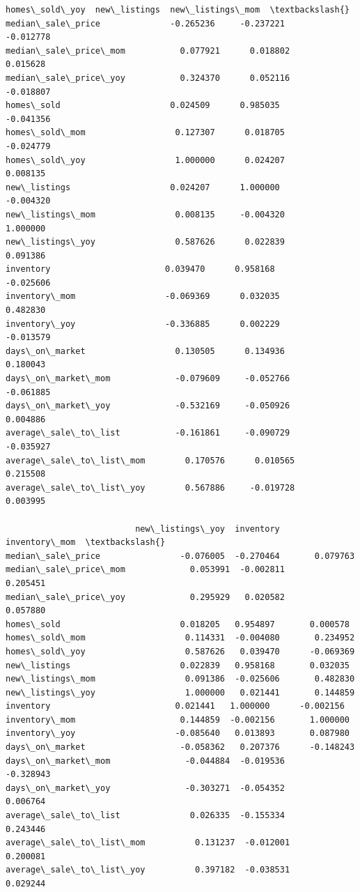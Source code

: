 \documentclass[11pt]{article}
\begin{document}
\begin{Verbatim}[commandchars=\\\{\}]
                          homes\_sold\_yoy  new\_listings  new\_listings\_mom  \textbackslash{}
median\_sale\_price              -0.265236     -0.237221         -0.012778   
median\_sale\_price\_mom           0.077921      0.018802          0.015628   
median\_sale\_price\_yoy           0.324370      0.052116         -0.018807   
homes\_sold                      0.024509      0.985035         -0.041356   
homes\_sold\_mom                  0.127307      0.018705         -0.024779   
homes\_sold\_yoy                  1.000000      0.024207          0.008135   
new\_listings                    0.024207      1.000000         -0.004320   
new\_listings\_mom                0.008135     -0.004320          1.000000   
new\_listings\_yoy                0.587626      0.022839          0.091386   
inventory                       0.039470      0.958168         -0.025606   
inventory\_mom                  -0.069369      0.032035          0.482830   
inventory\_yoy                  -0.336885      0.002229         -0.013579   
days\_on\_market                  0.130505      0.134936          0.180043   
days\_on\_market\_mom             -0.079609     -0.052766         -0.061885   
days\_on\_market\_yoy             -0.532169     -0.050926          0.004886   
average\_sale\_to\_list           -0.161861     -0.090729         -0.035927   
average\_sale\_to\_list\_mom        0.170576      0.010565          0.215508   
average\_sale\_to\_list\_yoy        0.567886     -0.019728          0.003995   

                          new\_listings\_yoy  inventory  inventory\_mom  \textbackslash{}
median\_sale\_price                -0.076005  -0.270464       0.079763   
median\_sale\_price\_mom             0.053991  -0.002811       0.205451   
median\_sale\_price\_yoy             0.295929   0.020582       0.057880   
homes\_sold                        0.018205   0.954897       0.000578   
homes\_sold\_mom                    0.114331  -0.004080       0.234952   
homes\_sold\_yoy                    0.587626   0.039470      -0.069369   
new\_listings                      0.022839   0.958168       0.032035   
new\_listings\_mom                  0.091386  -0.025606       0.482830   
new\_listings\_yoy                  1.000000   0.021441       0.144859   
inventory                         0.021441   1.000000      -0.002156   
inventory\_mom                     0.144859  -0.002156       1.000000   
inventory\_yoy                    -0.085640   0.013893       0.087980   
days\_on\_market                   -0.058362   0.207376      -0.148243   
days\_on\_market\_mom               -0.044884  -0.019536      -0.328943   
days\_on\_market\_yoy               -0.303271  -0.054352       0.006764   
average\_sale\_to\_list              0.026335  -0.155334       0.243446   
average\_sale\_to\_list\_mom          0.131237  -0.012001       0.200081   
average\_sale\_to\_list\_yoy          0.397182  -0.038531       0.029244   


\end{Verbatim}
\end{document}
